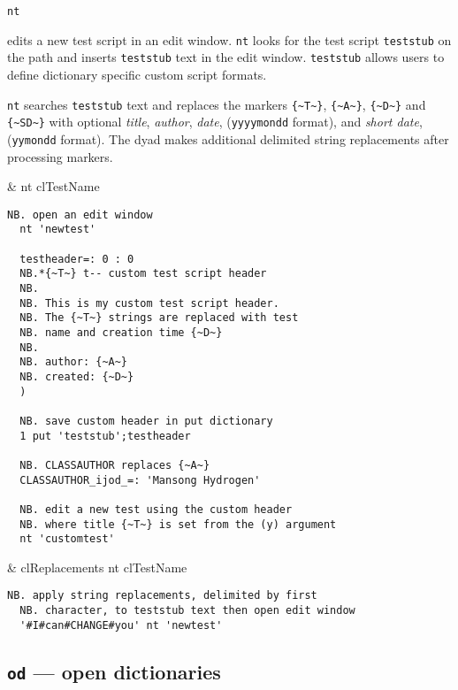 \hypertarget{il:nt}{\texttt{nt}} edits a new test script in an edit window. 
\texttt{nt} looks for the test script \texttt{teststub} on the path and inserts 
\texttt{teststub} text in the edit window. \texttt{teststub} allows users to define dictionary specific
custom script formats.

\texttt{nt} searches \texttt{teststub} text and replaces the markers
\verb|{~T~}|, \verb|{~A~}|, \verb|{~D~}| and \verb|{~SD~}| with optional
\emph{title}, \emph{author}, \emph{date}, (\texttt{yyyymondd} format), and 
\emph{short date}, (\texttt{yymondd} format). The dyad makes additional 
delimited string replacements after processing
markers.

\begin{wordhead}
\monad & nt clTestName \\
\end{wordhead}
\begin{lstlisting}[frame=single,framerule=0pt] 
  NB. open an edit window
  nt 'newtest'  

  testheader=: 0 : 0
  NB.*{~T~} t-- custom test script header
  NB. 
  NB. This is my custom test script header.
  NB. The {~T~} strings are replaced with test
  NB. name and creation time {~D~}
  NB.
  NB. author: {~A~}
  NB. created: {~D~}
  ) 

  NB. save custom header in put dictionary
  1 put 'teststub';testheader
  
  NB. CLASSAUTHOR replaces {~A~}
  CLASSAUTHOR_ijod_=: 'Mansong Hydrogen'

  NB. edit a new test using the custom header
  NB. where title {~T~} is set from the (y) argument
  nt 'customtest'
\end{lstlisting}

\begin{wordhead}
\dyad & clReplacements nt clTestName \\
\end{wordhead}
\begin{lstlisting}[frame=single,framerule=0pt]
  NB. apply string replacements, delimited by first
  NB. character, to teststub text then open edit window
  '#I#can#CHANGE#you' nt 'newtest' 
\end{lstlisting}


\subsection{\texttt{od} --- open dictionaries}\label{ss:od}

